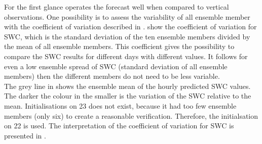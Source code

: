 \noindent
For the first glance operates the forecast well when compared to vertical observations. One possibility is to assess the variability of all ensemble member with the coefficient of variation described in . 
 show the coefficient of variation for SWC, which is the standard deviation of the ten ensemble members divided by the mean of all ensemble members. This coefficient gives the possibility to compare the SWC results for different days with different values. It follows for even a low ensemble spread of SWC (standard deviation of all ensemble members) then the different members do not need to be less variable.
\\
The grey line in  shows the ensemble mean of the hourly predicted SWC values. The darker the colour in  the smaller is the variation of the SWC relative to the mean. Initialisations on \SI{23}{\dec} does not exist, because it had too few ensemble members (only six) to create a reasonable verification. Therefore, the initialsation on \SI{22}{\dec} is used. The interpretation of the coefficient of variation for SWC is presented in .
